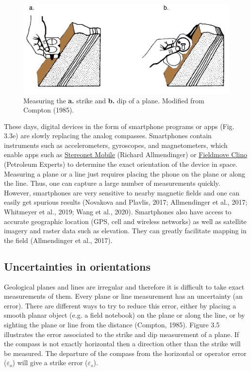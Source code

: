 \documentclass[a4paper , 12pt]{book}
\begin{document}
\begin{figure}[ht]
    \centering
    \includegraphics[width=12cm]{ch3f4.pdf}
    \caption{Measuring the \textbf{a.} strike and \textbf{b.} dip of a plane. Modified from Compton (1985).}
\end{figure}

These days, digital devices in the form of smartphone programs or apps (Fig. 3.3e) are slowly replacing the analog compasses. Smartphones contain instruments such as accelerometers, gyroscopes, and magnetometers, which enable apps such as \href{http://www.geo.cornell.edu/geology/faculty/RWA/programs/stereonet-mobile.html}{Stereonet Mobile} (Richard Allmendinger) or \href{https://www.petex.com/products/move-suite/digital-field-mapping/}{Fieldmove Clino} (Petroleum Experts) to determine the exact orientation of the device in space. Measuring a plane or a line just requires placing the phone on the plane or along the line. Thus, one can capture a large number of measurements quickly. However, smartphones are very sensitive to nearby magnetic fields and one can easily get spurious results (Novakova and Plavlis, 2017; Allmendinger et al., 2017; Whitmeyer et al., 2019; Wang et al., 2020). Smartphones also have access to accurate geographic location (GPS, cell and wireless networks) as well as satellite imagery and raster data such as elevation. They can greatly facilitate mapping in the field (Allmendinger et al., 2017).

\subsection{Uncertainties in orientations} \label{uncertainties}

Geological planes and lines are irregular and therefore it is difficult to take exact measurements of them. Every plane or line measurement has an uncertainty (an error). There are different ways to try to reduce this error, either by placing a smooth planar object (e.g. a field notebook) on the plane or along the line, or by sighting the plane or line from the distance (Compton, 1985). Figure 3.5 illustrates the error associated to the strike and dip measurement of a plane. If the compass is not exactly horizontal then a direction other than the strike will be measured. The departure of the compass from the horizontal or operator error ($\varepsilon_o$) will give a strike error ($\varepsilon_s$).
\end{document}
